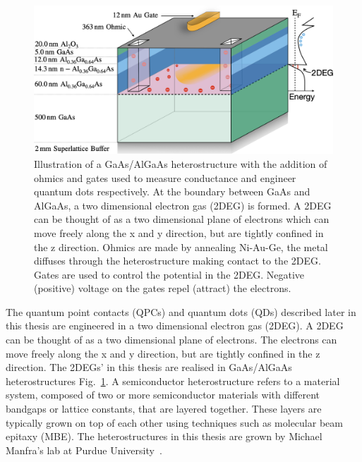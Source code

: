 \begin{figure}[!htb]
 \begin{center}
  \includegraphics[width=1.0\textwidth]{figures/ch1/crop_FiguresMaster.002.png}
  \caption[Two dimensional electron gas in a GaAs/AlGaAs heterostructure]{\label{fig:ch1/2deg} 
  Illustration of a GaAs/AlGaAs heterostructure with the addition of ohmics and gates used to measure conductance and engineer quantum dots respectively. At the boundary between GaAs and AlGaAs, a two dimensional electron gas (2DEG) is formed. A 2DEG can be thought of as a two dimensional plane of electrons which can move freely along the x and y direction, but are tightly confined in the z direction. Ohmics are made by annealing Ni-Au-Ge, the metal diffuses through the heterostructure making contact to the 2DEG. Gates are used to control the potential in the 2DEG. Negative (positive) voltage on the gates repel (attract) the electrons.
   }
 \end{center}
\end{figure}



The quantum point contacts (QPCs) and quantum dots (QDs) described later in this thesis are engineered in a two dimensional electron gas (2DEG). A 2DEG can be thought of as a two dimensional plane of electrons. The electrons can move freely along the x and y direction, but are tightly confined in the z direction. The 2DEGs' in this thesis are realised in GaAs/AlGaAs heterostructures Fig.~\ref{fig:ch1/2deg}. A semiconductor heterostructure refers to a material system, composed of two or more semiconductor materials with different bandgaps or lattice constants, that are layered together. These layers are typically grown on top of each other using techniques such as molecular beam epitaxy (MBE). The heterostructures in this thesis are grown by Michael Manfra's lab at Purdue University~\cite{manfra_high_quality}. 

